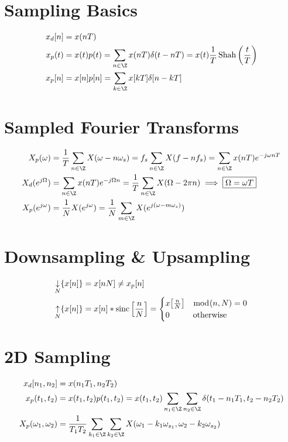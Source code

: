 \documentclass{article}
\DeclareMathOperator{\Shah}{Shah}
\DeclareMathOperator{\down}{\downarrow}
\DeclareMathOperator{\up}{\uparrow}
\DeclareMathOperator{\sinc}{sinc}
\begin{document}
\section{Sampling Basics}

\begin{align}
    x_d[n] &= x(nT) \\
    x_p(t) &= x(t) p(t) = \sum_{n \in \Z} x(nT) \delta(t - nT) = x(t) \frac{1}{T} \Shah\qty(\frac{t}{T}) \\
    x_p[n] &= x[n] p[n] = \sum_{k \in \Z} x[kT] \delta[n - kT] \\
\end{align}

\section{Sampled Fourier Transforms}

\begin{align}
    X_p(\omega) &= \frac{1}{T} \sum_{n \in \Z} X(\omega - n\omega_s) = f_s \sum_{n \in \Z} X(f - nf_s) = \sum_{n \in \Z} x(nT) e^{-j \omega nT} \\
    X_d(e^{j \Omega}) &= \sum_{n \in \Z} x(nT) e^{-j \Omega n} = \frac{1}{T} \sum_{n \in \Z} X(\Omega - 2\pi n) \implies \boxed{\Omega = \omega T} \\
    X_p(e^{j \omega}) &= \frac{1}{N} X(e^{j \omega}) = \frac{1}{N} \sum_{m \in \Z} X(e^{j (\omega - m \omega_s)})
\end{align}

\section{Downsampling \& Upsampling}

\begin{align}
    \down_N\{x[n]\} &= x[nN] \neq x_p[n] \\
    \up_N\{x[n]\} &= x[n] \ast \sinc\qty[\frac{n}{N}] =
    \begin{cases}
        x\qty[\frac{n}{N}] & \bmod(n, N) = 0 \\
        0 & \text{otherwise}
    \end{cases}
\end{align}

\section{2D Sampling}

\begin{align}
    x_d[n_1, n_2] &= x(n_1T_1, n_2T_2) \\
    x_p(t_1, t_2) &= x(t_1, t_2) p(t_1, t_2) = x(t_1, t_2) \sum_{n_1 \in \Z} \sum_{n_2 \in \Z} \delta(t_1 - n_1T_1, t_2 - n_2T_2) \\
    X_p(\omega_1, \omega_2) &= \frac{1}{T_1 T_2} \sum_{k_1 \in \Z} \sum_{k_2 \in \Z} X(\omega_1 - k_1 \omega_{s_1}, \omega_2 - k_2 \omega_{s_2})
\end{align}
\end{document}
